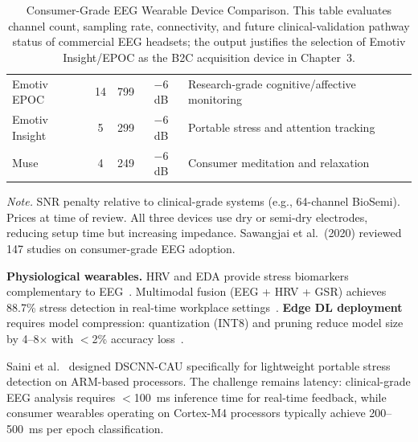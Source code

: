 \begin{table}[H]
\tablestripes\tablefontsize
\caption[Consumer-Grade EEG Wearable Device Comparison]{Consumer-Grade EEG Wearable Device Comparison. This table evaluates channel count, sampling rate, connectivity, and future clinical-validation pathway status of commercial EEG headsets; the output justifies the selection of Emotiv Insight/EPOC as the B2C acquisition device in Chapter~3.}
\tablefontsize
\begin{tabularx}{\textwidth}{@{} >{\raggedright\arraybackslash}p{2.8cm} C C C L @{}}
\toprule
{} &  &  &  &  \\
\midrule
Emotiv EPOC & 14 & 799 & $-$6 dB & Research-grade cognitive/affective monitoring \\
\addlinespace
Emotiv Insight & 5 & 299 & $-$6 dB & Portable stress and attention tracking \\
\addlinespace
Muse & 4 & 249 & $-$6 dB & Consumer meditation and relaxation \\
\bottomrule
\end{tabularx}
\vspace{0.5em}\noindent\textit{Note.} SNR penalty relative to clinical-grade systems (e.g., 64-channel BioSemi). Prices at time of review. All three devices use dry or semi-dry electrodes, reducing setup time but increasing impedance. Sawangjai et al.\ (2020) reviewed 147 studies on consumer-grade EEG adoption.
\end{table}

\textbf{Physiological wearables.} HRV and EDA provide stress biomarkers complementary to EEG~\cite{healey2005driving, schmidt2018wesad}. Multimodal fusion (EEG + HRV + GSR) achieves 88.7\% stress detection in real-time workplace settings~\cite{ahn2022wearable}. \textbf{Edge DL deployment} requires model compression: quantization (INT8) and pruning reduce model size by 4--8$\times$ with $<$2\% accuracy loss~\cite{nvidia2023tensorrt}.

Saini et al.~\cite{saini2022dscnn} designed DSCNN-CAU specifically for lightweight portable stress detection on ARM-based processors. The challenge remains latency: clinical-grade EEG analysis requires $<$100~ms inference time for real-time feedback, while consumer wearables operating on Cortex-M4 processors typically achieve 200--500~ms per epoch classification.


